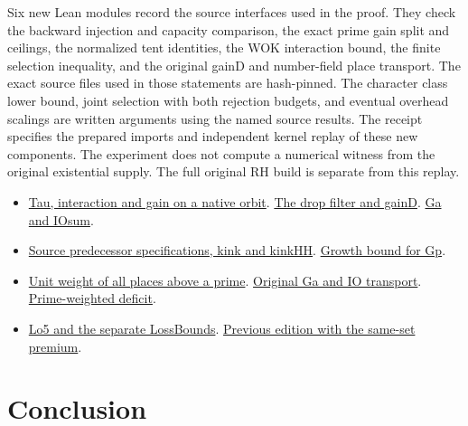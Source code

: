 \documentclass[12pt,letterpaper]{article}
\DeclareRobustCommand{\id}[1]{\mbox{\small\ttfamily #1}}
\newcommand{\old}[3]{\href{https://github.com/nousentllc/riemann-hypothesis/blob/40e56bab026552e089d7afcfeff08d2defb9c005/src/#1\#L#2}{#3}}
\begin{document}
Six new Lean modules record the source interfaces used in the proof. They check the backward injection and capacity comparison, the exact prime gain split and ceilings, the normalized tent identities, the \id{WOK} interaction bound, the finite selection inequality, and the original \id{gainD} and number-field place transport. The exact source files used in those statements are hash-pinned. The character class lower bound, joint selection with both rejection budgets, and eventual overhead scalings are written arguments using the named source results. The receipt specifies the prepared imports and independent kernel replay of these new components. The experiment does not compute a numerical witness from the original existential supply. The full original RH build is separate from this replay.

\begin{itemize}[leftmargin=*]
\item \old{Formalism/LocalToGlobal/GlobalTheory/IsResidueClassZero.lean}{212}{Tau, interaction and gain on a native orbit}. \old{Formalism/LocalToGlobal/GlobalTheory/IsResidueClassZero.lean}{392}{The drop filter and gainD}. \old{Formalism/LocalToGlobal/GlobalTheory/IsResidueClassZero.lean}{466}{Ga and IOsum}.
\item \old{Formalism/SharpRestriction/GrowthBounds/LogarithmicSums/PartnerCountOfCentral.lean}{107}{Source predecessor specifications, kink and kinkHH}. \old{Formalism/SharpRestriction/GrowthBounds/LogarithmicSums/StarNumB.lean}{23}{Growth bound for Gp}.
\item \old{Formalism/LocalRingCardinality/RankBoundMonotoneInDimension.lean}{1090}{Unit weight of all places above a prime}. \old{Formalism/LocalToGlobal/GlobalTheory/PowFourLtCeilThresholdPrime.lean}{210}{Original Ga and IO transport}. \old{Formalism/SizeWindowBrackets/SecondKindBucket.lean}{17}{Prime-weighted deficit}.
\item \old{Formalism/SizeWindowBrackets/QuotientSlopeBoundsWith.lean}{15}{Lo5 and the separate LossBounds}. \href{https://github.com/nousentllc/riemann-hypothesis/commit/59994e6770c0746f5d4462017b38b1f74af77364}{Previous edition with the same-set premium}.
\end{itemize}

\section{Conclusion}
\end{document}
